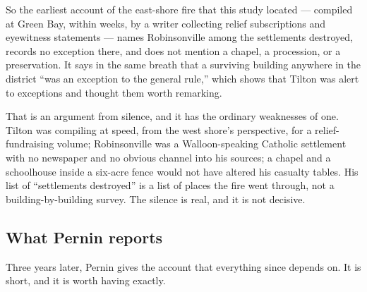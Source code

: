 So the earliest account of the east-shore fire that this study located
--- compiled at Green Bay, within weeks, by a writer collecting relief
subscriptions and eyewitness statements --- names Robinsonville among
the settlements destroyed, records no exception there, and does not
mention a chapel, a procession, or a preservation. It says in the same
breath that a surviving building anywhere in the district ``was an
exception to the general rule,'' which shows that Tilton was alert to
exceptions and thought them worth remarking.

That is an argument from silence, and it has the ordinary weaknesses of
one. Tilton was compiling at speed, from the west shore's perspective,
for a relief-fundraising volume; Robinsonville was a Walloon-speaking
Catholic settlement with no newspaper and no obvious channel into his
sources; a chapel and a schoolhouse inside a six-acre fence would not
have altered his casualty tables. His list of ``settlements destroyed''
is a list of places the fire went through, not a building-by-building
survey. The silence is real, and it is not decisive.

\subsection{What Pernin reports}

Three years later, Pernin gives the account that everything since
depends on. It is short, and it is worth having exactly.

